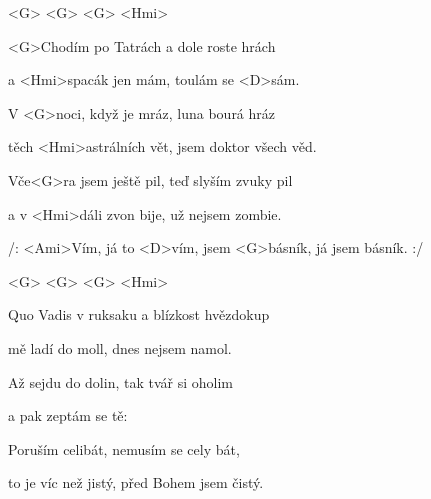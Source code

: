 

<G> <G> <G> <Hmi>

\zs
<G>Chodím po Tatrách a dole roste hrách

a <Hmi>spacák jen mám, toulám se <D>sám.

V <G>noci, když je mráz, luna bourá hráz

těch <Hmi>astrálních vět, jsem doktor všech věd.

Vče<G>ra jsem ještě pil, teď slyším zvuky pil

a v <Hmi>dáli zvon bije, už nejsem zombie.
\ks

\zr
/: <Ami>Vím, já to <D>vím,
jsem <G>básník, já jsem básník. :/
\kr

<G> <G> <G> <Hmi>

\zs
Quo Vadis v ruksaku a blízkost hvězdokup

mě ladí do moll, dnes nejsem namol.

Až sejdu do dolin, tak tvář si oholim

a pak zeptám se tě: 

Poruším celibát, nemusím se cely bát,

to je víc než jistý, před Bohem jsem čistý.
\ks

\zr \kr \zr \kr \zr \kr

\kp





